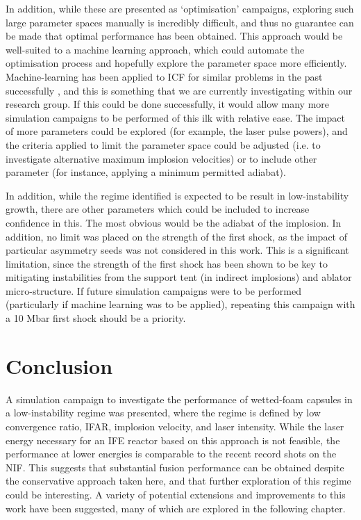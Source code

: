 In addition, while these are presented as `optimisation' campaigns, exploring such large parameter spaces manually is incredibly difficult, and thus no guarantee can be made that optimal performance has been obtained. This approach would be well-suited to a machine learning approach, which could automate the optimisation process and hopefully explore the parameter space more efficiently. Machine-learning has been applied to ICF for similar problems in the past successfully \cite{Hatfield2019}, and this is something that we are currently investigating within our research group. If this could be done successfully, it would allow many more simulation campaigns to be performed of this ilk with relative ease. The impact of more parameters could be explored (for example, the laser pulse powers), and the criteria applied to limit the parameter space could be adjusted (i.e. to investigate alternative maximum implosion velocities) or to include other parameter (for instance, applying a minimum permitted adiabat).

In addition, while the regime identified is expected to be result in low-instability growth, there are other parameters which could be included to increase confidence in this. The most obvious would be the adiabat of the implosion. In addition, no limit was placed on the strength of the first shock, as the impact of particular asymmetry seeds was not considered in this work. This is a significant limitation, since the strength of the first shock has been shown to be key to mitigating instabilities from the support tent (in indirect implosions) and ablator micro-structure. If future simulation campaigns were to be performed (particularly if machine learning was to be applied), repeating this campaign with a 10 Mbar first shock should be a priority.

\section{Conclusion}
A simulation campaign to investigate the performance of wetted-foam capsules in a low-instability regime was presented, where the regime is defined by low convergence ratio, IFAR, implosion velocity, and laser intensity. While the laser energy necessary for an IFE reactor based on this approach is not feasible, the performance at lower energies is comparable to the recent record shots on the NIF. This suggests that substantial fusion performance can be obtained despite the conservative approach taken here, and that further exploration of this regime could be interesting. A variety of potential extensions and improvements to this work have been suggested, many of which are explored in the following chapter.

